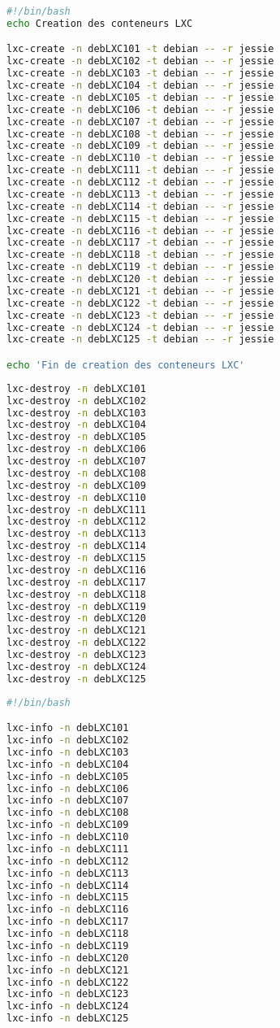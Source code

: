 \documentclass[french]{article}
\begin{document}
\begin{lstlisting}[language=bash,caption={Creation conteneurs}]
#!/bin/bash
echo Creation des conteneurs LXC

lxc-create -n debLXC101 -t debian -- -r jessie
lxc-create -n debLXC102 -t debian -- -r jessie
lxc-create -n debLXC103 -t debian -- -r jessie
lxc-create -n debLXC104 -t debian -- -r jessie
lxc-create -n debLXC105 -t debian -- -r jessie
lxc-create -n debLXC106 -t debian -- -r jessie
lxc-create -n debLXC107 -t debian -- -r jessie
lxc-create -n debLXC108 -t debian -- -r jessie
lxc-create -n debLXC109 -t debian -- -r jessie
lxc-create -n debLXC110 -t debian -- -r jessie
lxc-create -n debLXC111 -t debian -- -r jessie
lxc-create -n debLXC112 -t debian -- -r jessie
lxc-create -n debLXC113 -t debian -- -r jessie
lxc-create -n debLXC114 -t debian -- -r jessie
lxc-create -n debLXC115 -t debian -- -r jessie
lxc-create -n debLXC116 -t debian -- -r jessie
lxc-create -n debLXC117 -t debian -- -r jessie
lxc-create -n debLXC118 -t debian -- -r jessie
lxc-create -n debLXC119 -t debian -- -r jessie
lxc-create -n debLXC120 -t debian -- -r jessie
lxc-create -n debLXC121 -t debian -- -r jessie
lxc-create -n debLXC122 -t debian -- -r jessie
lxc-create -n debLXC123 -t debian -- -r jessie
lxc-create -n debLXC124 -t debian -- -r jessie
lxc-create -n debLXC125 -t debian -- -r jessie

echo 'Fin de creation des conteneurs LXC'

\end{lstlisting}

\begin{lstlisting}[language=bash,caption={Destruction conteneurs}]
lxc-destroy -n debLXC101 
lxc-destroy -n debLXC102 
lxc-destroy -n debLXC103 
lxc-destroy -n debLXC104 
lxc-destroy -n debLXC105 
lxc-destroy -n debLXC106 
lxc-destroy -n debLXC107 
lxc-destroy -n debLXC108 
lxc-destroy -n debLXC109 
lxc-destroy -n debLXC110 
lxc-destroy -n debLXC111 
lxc-destroy -n debLXC112 
lxc-destroy -n debLXC113 
lxc-destroy -n debLXC114 
lxc-destroy -n debLXC115 
lxc-destroy -n debLXC116 
lxc-destroy -n debLXC117 
lxc-destroy -n debLXC118 
lxc-destroy -n debLXC119 
lxc-destroy -n debLXC120 
lxc-destroy -n debLXC121 
lxc-destroy -n debLXC122 
lxc-destroy -n debLXC123 
lxc-destroy -n debLXC124 
lxc-destroy -n debLXC125 
\end{lstlisting}


\begin{lstlisting}[language=bash,caption={Obtenion d'info sur les conteneurs}]
#!/bin/bash

lxc-info -n debLXC101 
lxc-info -n debLXC102 
lxc-info -n debLXC103 
lxc-info -n debLXC104 
lxc-info -n debLXC105 
lxc-info -n debLXC106 
lxc-info -n debLXC107 
lxc-info -n debLXC108 
lxc-info -n debLXC109 
lxc-info -n debLXC110 
lxc-info -n debLXC111 
lxc-info -n debLXC112 
lxc-info -n debLXC113 
lxc-info -n debLXC114 
lxc-info -n debLXC115 
lxc-info -n debLXC116 
lxc-info -n debLXC117 
lxc-info -n debLXC118 
lxc-info -n debLXC119 
lxc-info -n debLXC120 
lxc-info -n debLXC121 
lxc-info -n debLXC122 
lxc-info -n debLXC123 
lxc-info -n debLXC124 
lxc-info -n debLXC125 
\end{lstlisting}
\end{document}
